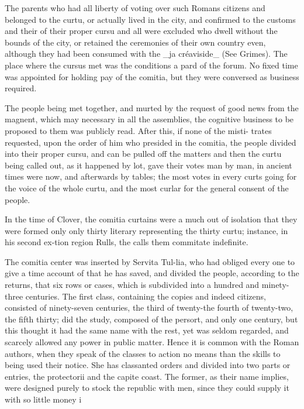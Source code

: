 \documentclass{article}
\begin{document}
The parents who had all liberty of voting over such Romans citizens and belonged to the curtu, or actually lived in the city, and confirmed to the customs and their of their proper cursu and all were excluded who dwell without the bounds of the city, or retained the ceremonies of their own country even, although they had been consumed with the \_ja créaviside\_ (See Grimes). The place where the cursus met was the conditions a pard of the forum. No fixed time was appointed for holding pay of the comitia, but they were conversed as business required.

The people being met together, and murted by the request of good news from the magnent, which may necessary in all the assemblies, the cognitive business to be proposed to them was publicly read. After this, if none of the misti- trates requested, upon the order of him who presided in the comitia, the people divided into their proper cursu, and can be pulled off the matters and then the curtu being called out, as it happened by lot, gave their votes man by man, in ancient times were now, and afterwards by tables; the most votes in every curts going for the voice of the whole curtu, and the most curlar for the general consent of the people.

In the time of Clover, the comitia curtains were a much out of isolation that they were formed only only thirty literary representing the thirty curtu; instance, in his second ex-tion region Rulls, the calls them commitate indefinite.

The comitia center was inserted by Servita Tul-lia, who had obliged every one to give a time account of that he has saved, and divided the people, according to the returns, that six rows or cases, which is subdivided into a hundred and minety-three centuries. The first class, containing the copies and indeed citizens, consisted of ninety-seven centuries, the third of twenty-the fourth of twenty-two, the fifth thirty; did the study, composed of the persort, and only one century, but this thought it had the same name with the rest, yet was seldom regarded, and scarcely allowed any power in public matter. Hence it is common with the Roman authors, when they speak of the classes to action no means than the skills to being used their notice. She has classanted orders and divided into two parts or entries, the protectorii and the capite coast. The former, as their name implies, were designed purely to stock the republic with men, since they could supply it with so little money i
\end{document}
